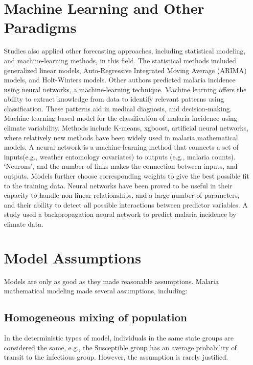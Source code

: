 \documentclass[a4paper, 12pt, twoside]{report}
\begin{document}
\section{Machine Learning and Other Paradigms}%
\label{sub:machine_learning}
Studies also applied other forecasting approaches, including statistical modeling, and machine-learning methods, in this field.
The statistical methods included generalized linear models, Auto-Regressive Integrated Moving Average (ARIMA) models\cite{box2015time,Anokye2018}, and Holt-Winters models\cite{Chatfield1978}.
Other authors\cite{Toh2021a,Libbrecht2015,Nkiruka2021,Verma2020,Kim2019,Khameneh2014,Ebhuoma2018,Hancock2020} predicted malaria incidence using neural networks, a machine-learning technique.
Machine learning offers the ability to extract knowledge from data to identify relevant patterns using classification. These patterns aid in medical diagnosis, and decision-making.
Machine learning-based model for the classification of malaria incidence using climate variability.
Methods include K-means, \gls{xgboost}, artificial neural networks, where relatively new methods have been widely used in malaria mathematical models.
A neural network is a machine-learning method that connects a set of inputs(e.g., weather entomology covariates) to outputs (e.g., malaria counts).
‘Neurons', and the number of links makes the connection between inputs, and outputs.
Models further choose corresponding weights to give the best possible fit to the training data.
Neural networks have been proved to be useful in their capacity to handle non-linear relationships, and a large number of parameters, and their ability to detect all possible interactions between predictor variables.
A study\cite{Verma2020} used a backpropagation neural network to predict malaria incidence by climate data.

\section{Model Assumptions}
Models are only as good as they made reasonable assumptions.
Malaria mathematical modeling made several assumptions, including:

\subsection{Homogeneous mixing of population}%
\label{par:homogeneous_mixing_of_population}
In the deterministic types of model, individuals in the same state groups are considered the same, e.g., the Susceptible group has an average probability of transit to the infectious group.
However, the assumption is rarely justified.
\end{document}
